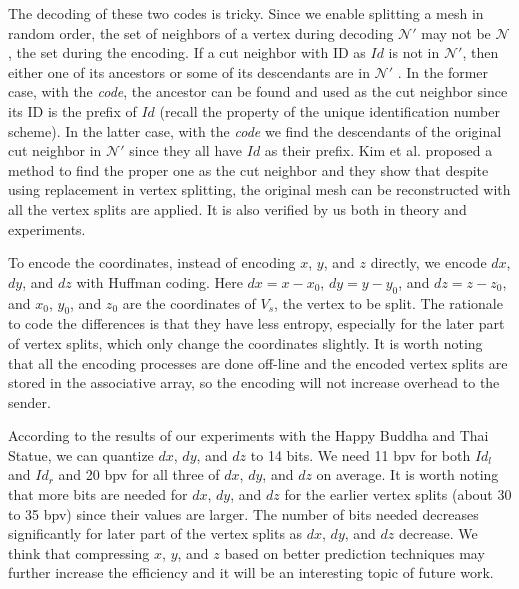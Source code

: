     The decoding of these two codes is tricky. %
    Since we enable splitting a mesh in random order, the set of neighbors of a vertex
    during decoding $\mathcal{N}'$ may not be $\mathcal{N}$, the set during the encoding.
    If a cut neighbor with ID as $Id$ %
    is not in $\mathcal{N}'$, then either one of its 
    ancestors or some of its descendants are in $\mathcal{N}'$ \cite{multiresolution:kim}.
    In the former case, with the \emph{code}, the ancestor can be found and used as 
    the cut neighbor since its ID is the prefix of $Id$ 
    (recall the property of the unique identification number scheme).
    In the latter case, with the \emph{code} we find the descendants of the original 
    cut neighbor in $\mathcal{N}'$ since they all have $Id$ as their prefix.
    Kim et al. \cite{multiresolution:kim} proposed a method to find the 
    proper one as the cut neighbor and they show that despite using replacement
    in vertex splitting, the original mesh can be 
    reconstructed with all the vertex splits are applied. It is also verified 
    by us both in theory and experiments.
    
    To encode the coordinates, instead of encoding $x$, $y$, and $z$ directly, 
    we encode $dx$, $dy$, and $dz$ with Huffman coding. 
    Here $dx = x - x_0$, $dy = y - y_0$, 
    and $dz = z - z_0$, and $x_0$, $y_0$, and $z_0$ are the coordinates of
    $V_s$, the vertex to be split. 
    The rationale to code the differences is that they have less entropy, especially
    for the later part of vertex splits, which only change the coordinates slightly.
    It is worth noting that all the encoding processes are done off-line and the 
    encoded vertex splits are stored in the associative array, so the encoding will
    not increase overhead to the sender.

    According to the results of our experiments with the Happy Buddha and Thai Statue,
    we can quantize $dx$, $dy$, and $dz$ to 14 bits. 
    We need 11 bpv for both $Id_l$ and $Id_r$ 
    and 20 bpv for all three of $dx$, $dy$, and $dz$ on average.
    It is worth noting that more bits are needed for $dx$, $dy$, and $dz$ 
    for the earlier vertex splits (about 30 to 35 bpv)
    since their values are larger. 
    The number of bits needed decreases significantly for later part of the vertex splits
    as $dx$, $dy$, and $dz$ decrease. We think that compressing $x$, $y$, and $z$ 
    based on better prediction techniques may further increase the 
    efficiency and it will be an interesting topic of future work.

